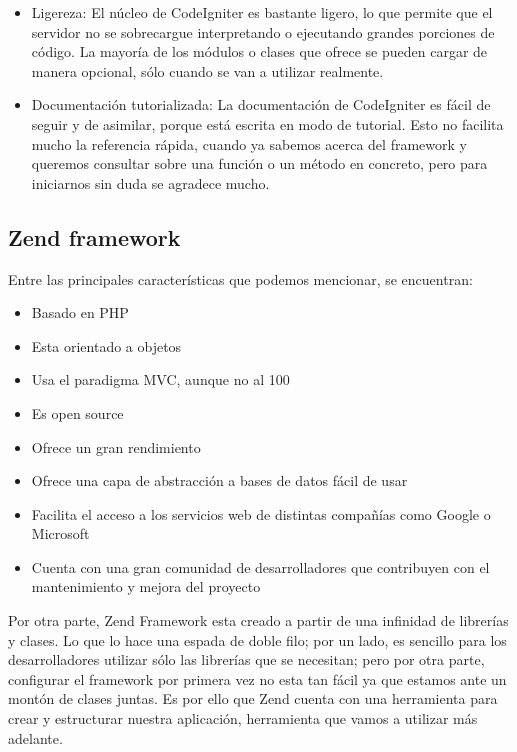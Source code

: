 \begin{itemize}
\item Ligereza: El núcleo de CodeIgniter es bastante ligero, lo que permite que el servidor no se sobrecargue interpretando o ejecutando grandes porciones de código. La mayoría de los módulos o clases que ofrece se pueden cargar de manera opcional, sólo cuando se van a utilizar realmente.

\item Documentación tutorializada: La documentación de CodeIgniter es fácil de seguir y de asimilar, porque está escrita en modo de tutorial. Esto no facilita mucho la referencia rápida, cuando ya sabemos acerca del framework y queremos consultar sobre una función o un método en concreto, pero para iniciarnos sin duda se agradece mucho.

\end{itemize}

 \newpage

\subsection{Zend framework}

Entre las principales características que podemos mencionar, se encuentran:

\begin{itemize}

\item Basado en PHP
\item Esta orientado a objetos
\item Usa el paradigma MVC, aunque no al 100%
\item Es open source
\item Ofrece un gran rendimiento
\item Ofrece una capa de abstracción a bases de datos fácil de usar
\item Facilita el acceso a los servicios web de distintas compañías como Google o Microsoft
\item Cuenta con una gran comunidad de desarrolladores que contribuyen con el mantenimiento y mejora del proyecto

\end{itemize}

Por otra parte, Zend Framework esta creado a partir de una infinidad de librerías y clases. Lo que lo hace una espada de doble filo; por un lado, es sencillo para los desarrolladores utilizar sólo las librerías que se necesitan; pero por otra parte, configurar el framework por primera vez no esta tan fácil ya que estamos ante un montón de clases juntas. Es por ello que Zend cuenta con una herramienta para crear y estructurar nuestra aplicación, herramienta que vamos a utilizar más adelante.

